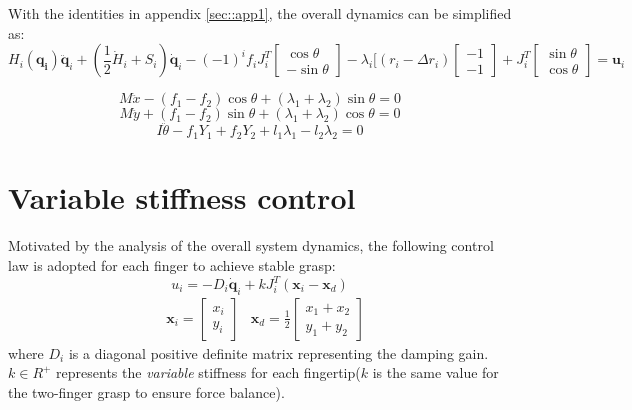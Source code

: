 \documentclass[]{article}
\begin{document}
With the identities in appendix \ref{sec::app1}, the overall dynamics can be simplified as:
\begin{equation}
H_i(\mathbf{q_i})\ddot{\mathbf{q}}_i+(\frac{1}{2}\dot{H}_i+S_i)\mathbf{\dot{q}}_i-(-1)^if_iJ_i^T\begin{bmatrix}
\cos\theta\\
-\sin\theta
\end{bmatrix}-\lambda_i[(r_i-\Delta r_i)\begin{bmatrix}
-1\\-1
\end{bmatrix} + J_i^T\begin{bmatrix}
\sin\theta\\\cos\theta
\end{bmatrix}=\mathbf{u}_i
\end{equation}

\begin{equation}
M\ddot{x}-(f_1-f_2)\cos\theta+(\lambda_1+\lambda_2)\sin\theta=0
\end{equation}
\begin{equation}
M\ddot{y}+(f_1-f_2)\sin\theta+(\lambda_1+\lambda_2)\cos\theta = 0
\end{equation}
\begin{equation}
I\ddot{\theta}-f_1Y_1+f_2Y_2+l_1\lambda_1-l_2\lambda_2=0
\end{equation}
\section{Variable stiffness control}
Motivated by the analysis of the overall system dynamics, the following control law is adopted for each finger to achieve stable grasp:
\begin{equation}
u_i=-D_i\mathbf{\dot{q}}_i+kJ_i^T(\mathbf{x}_i-\mathbf{x}_d)
\label{eqn::control}
\end{equation}
\begin{align}
&\mathbf{x}_i=\begin{bmatrix}
x_i\\
y_i
\end{bmatrix}
&\mathbf{x}_d=\frac{1}{2}\begin{bmatrix}
x_1+x_2\\
y_1+y_2
\end{bmatrix}
\end{align}
where $D_i$ is a diagonal positive definite matrix representing the damping gain. $k\in R^+$ represents the \emph{variable} stiffness for each fingertip($k$ is the same value for the two-finger grasp to ensure force balance).
\end{document}
